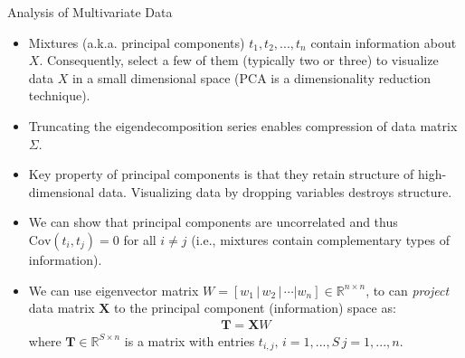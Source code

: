 \documentclass[handout,9pt]{beamer}
\begin{document}
\begin{frame}{Analysis of Multivariate Data}

\begin{itemize}
\setlength{\itemsep}{10pt}
\item Mixtures (a.k.a. principal components) $t_1,t_2,...,t_n$ contain information about $X$. Consequently, select a few of them (typically two or three) to visualize data $X$ in a small dimensional space (PCA is a dimensionality reduction technique). 

\item Truncating the eigendecomposition series enables compression of data matrix $\Sigma$. 

\item Key property of principal components is that they retain structure of high-dimensional data. Visualizing data by dropping variables destroys structure.

\item We can show that principal components are uncorrelated and thus $\textrm{Cov}(t_i,t_j)=0$ for all $i\neq j$ (i.e., mixtures contain complementary types of information). 

\item We can use eigenvector matrix $W=[w_1\,|\,w_2\,|\,\cdots|w_n]\in \mathbb{R}^{n\times n}$, to can {\em project} data matrix $\mathbf{X}$ to the principal component (information) space as: 
\begin{align*}
\mathbf{T}=\mathbf{X}W
\end{align*}
where $\mathbf{T}\in \mathbb{R}^{S\times n}$ is a matrix with entries $t_{i,j},\,i=1,...,S\, j=1,...,n$. 

 
\end{itemize}


\end{frame}
\end{document}
